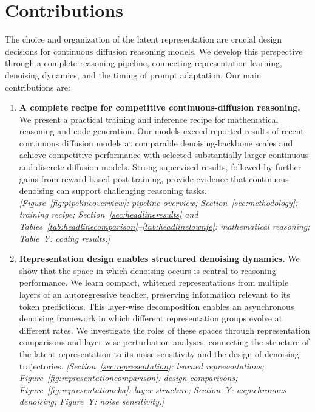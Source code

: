 \section{Contributions}
\label{sec:contributions}

The choice and organization of the latent representation are crucial design decisions for continuous diffusion reasoning models. We develop this perspective through a complete reasoning pipeline, connecting representation learning, denoising dynamics, and the timing of prompt adaptation. Our main contributions are:

\begin{enumerate}
    \item \textbf{A complete recipe for competitive continuous-diffusion reasoning.}
    We present a practical training and inference recipe for mathematical reasoning and code generation. Our models exceed reported results of recent continuous diffusion models at comparable denoising-backbone scales and achieve competitive performance with selected substantially larger continuous and discrete diffusion models. Strong supervised results, followed by further gains from reward-based post-training, provide evidence that continuous denoising can support challenging reasoning tasks.
    \emph{[Figure~\ref{fig:pipelineoverview}: pipeline overview; Section~\ref{sec:methodology}: training recipe; Section~\ref{sec:headlineresults} and Tables~\ref{tab:headlinecomparison}--\ref{tab:headlinelownfe}: mathematical reasoning; Table~Y: coding results.]}

    \item \textbf{Representation design enables structured denoising dynamics.}
    We show that the space in which denoising occurs is central to reasoning performance. We learn compact, whitened representations from multiple layers of an autoregressive teacher, preserving information relevant to its token predictions. This layer-wise decomposition enables an asynchronous denoising framework in which different representation groups evolve at different rates. We investigate the roles of these spaces through representation comparisons and layer-wise perturbation analyses, connecting the structure of the latent representation to its noise sensitivity and the design of denoising trajectories.
    \emph{[Section~\ref{sec:representation}: learned representations; Figure~\ref{fig:representationcomparison}: design comparisons; Figure~\ref{fig:representationcka}: layer structure; Section~Y: asynchronous denoising; Figure~Y: noise sensitivity.]}


\end{enumerate}
